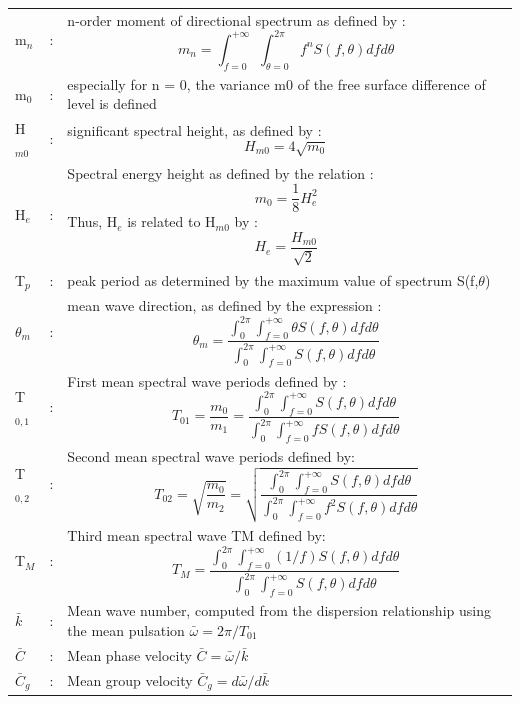 \begin{tabular}{p{0.8in}p{0.1in}p{3.5in}}
  m${}_{n}$ & : & n-order moment of directional spectrum as defined by :\newline
                  $$ m_{n} = \int_{f=0}^{+\infty}\int_{\theta=0}^{2\pi}f^{n}S(f,\theta)dfd\theta$$\\
  m${}_{0}$ & : & especially for n = 0, the variance m0 of the free surface difference of level is defined \\
  H${}_{m0}$ & : & significant spectral height, as defined by :\newline
                   $$ H_{m0} = 4\sqrt{m_{0}}$$\\
  H${}_{e}$ & : & Spectral energy height as defined by the relation :\newline
                  $$ m_{0} = \frac{1}{8}H_{e}^{2}$$
                  Thus, H${}_{e}$ is related to H${}_{m0}$ by : $$ H_{e} = \frac{H_{m0}}{\sqrt{2}}$$  \\
  T${}_{p}$ & : & peak period as determined by the maximum value of spectrum S(f,$\theta$) \\
  $\theta_{m}$ & : & mean wave direction, as defined by the expression :\newline
                   \[\theta_{m} =\frac{\int_{0}^{2\pi}\int_{f=0}^{+\infty} \theta S(f,\theta ) df d\theta}
                                 {\int_{0}^{2\pi}\int_{f=0}^{+\infty} S(f,\theta ) df d\theta} \] \\
  T${}_{0,1}$ & : & First mean spectral wave periods defined by :\newline
                   \[T_{01} =\frac{m_{0} }{m_{1} } = \frac{\int_{0}^{2\pi}\int_{f=0}^{+\infty} S(f,\theta ) df d\theta}
                                                         {\int_{0}^{2\pi}\int_{f=0}^{+\infty} f S(f,\theta ) df d\theta} \] \\
  T${}_{0,2}$ & : & Second mean spectral wave periods defined by:\newline
                   \[T_{02} =\sqrt{\frac{m_{0} }{m_{2}}} = \sqrt{\frac{\int_{0}^{2\pi}\int_{f=0}^{+\infty} S(f,\theta ) df d\theta}
                                                                      {\int_{0}^{2\pi}\int_{f=0}^{+\infty} f^{2}  S(f,\theta ) df d\theta}} \] \\
  T${}_{M}$ & : & Third mean spectral wave TM defined by:\newline
                  \[T_{M} =\frac{\int_{0}^{2\pi}\int_{f=0}^{+\infty} (1/f) S(f,\theta) df d\theta}
                                {\int_{0}^{2\pi}\int_{f=0}^{+\infty} S(f,\theta) df d\theta} \] \\
  $\bar{k}$ & : & Mean wave number, computed from the dispersion relationship using the mean pulsation $\bar{\omega}=2\pi /T_{01} $ \\
  $\bar{C}$ & : & Mean phase velocity $\bar{C}=\bar{\omega }/\bar{k}$ \\
  $\bar{C}_{g}$ & : & Mean group velocity $\bar{C}_{g} =d\bar{\omega }/d\bar{k}$ \\
\end{tabular}

